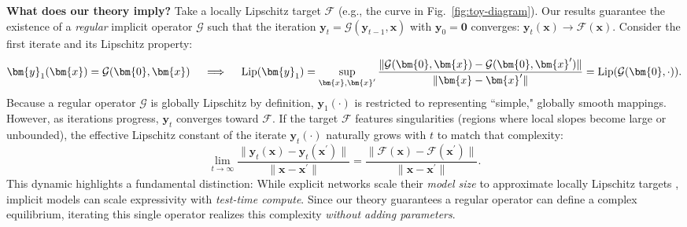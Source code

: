 \documentclass{amsart} %
\def\vzero{{\bm{0}}}
\def\vx{{\bm{x}}}
\def\vy{{\bm{y}}}
\def\cF{{\mathcal{F}}}
\def\cG{{\mathcal{G}}}
\theoremstyle{definition}
\theoremstyle{remark}
\begin{document}

\textbf{What does our theory imply?}
Take a locally Lipschitz target $\cF$ (e.g., the curve in Fig.~\ref{fig:toy-diagram}). Our results guarantee the existence of a \emph{regular} implicit operator $\cG$ such that the iteration $\vy_t=\cG(\vy_{t-1},\vx)$ with $\vy_0=\vzero$ converges: $\vy_t(\vx)\to\cF(\vx)$. Consider the first iterate and its Lipschitz property:
\[\vy_1(\vx)=\cG(\vzero,\vx) \quad \implies \quad \textup{Lip}(\vy_1) = \sup_{\vx,\vx^\prime} \frac{\|\cG(\vzero,\vx)-\cG(\vzero,\vx^\prime)\|}{\|\vx-\vx^\prime\|} = \textup{Lip}(\cG(\vzero,\cdot)).
\]
Because a regular operator $\mathcal{G}$ is globally Lipschitz by definition, $\vy_1(\cdot)$ is restricted to representing ``simple," globally smooth mappings. However, as iterations progress, $\vy_t$ converges toward $\mathcal{F}$. If the target $\mathcal{F}$ features singularities (regions where local slopes become large or unbounded), the effective Lipschitz constant of the iterate $\mathbf{y}_t(\cdot)$ naturally grows with $t$ to match that complexity:
\[
\lim_{t\to\infty}\frac{\|\vy_t(\vx)-\vy_t(\vx^\prime)\|}{\|\vx-\vx^\prime\|} = \frac{\|\cF(\vx)-\cF(\vx^\prime)\|}{\|\vx-\vx^\prime\|}.
\] 
This dynamic highlights a fundamental distinction: While explicit networks scale their \textit{model size} to approximate locally Lipschitz targets \cite{beneventano2021deep}, implicit models can scale expressivity with \textit{test-time compute}. Since our theory guarantees a regular operator can define a complex equilibrium, iterating this single operator realizes this complexity \textit{without adding parameters}.
\end{document}
